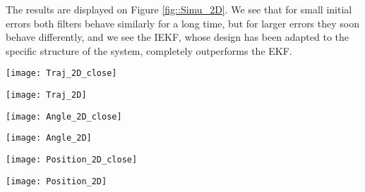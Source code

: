 \documentclass[a4paper,12pt,onecolumn]{article}
\begin{document}
The results are displayed on Figure \ref{fig::Simu_2D}. We see that for small initial errors both filters behave similarly for a long time, but for larger errors they soon behave differently, and we see  the IEKF, whose design has been adapted to the specific structure of the system, completely outperforms the EKF.



\begin{figure*}[!h]
  \centering
\begin{minipage}[b][]{0.49\linewidth}\noindent
\texttt{[image: Traj\_2D\_close]}
\end{minipage}
\begin{minipage}[b][]{0.49\linewidth}\noindent
\texttt{[image: Traj\_2D]}
\end{minipage}
\begin{minipage}[b][]{0.49\linewidth}
\texttt{[image: Angle\_2D\_close]}
\end{minipage}
\begin{minipage}[b][]{0.49\linewidth}
\texttt{[image: Angle\_2D]}
\end{minipage}
\begin{minipage}[b][]{0.49\linewidth}\noindent
\texttt{[image: Position\_2D\_close]}
\end{minipage}
\begin{minipage}[b][]{0.49\linewidth}\noindent
\texttt{[image: Position\_2D]}
\end{minipage}
  \caption{The heading and position of the car are estimated through EKF and IEKF with high rate odometry and low rate GPS measurements. Top plots illustrate the experimental setting and display the estimated trajectories, middle plots display the heading errors and bottom plots the position errors. As the starting point is assumed known in this simulation, the initial values of the latter are zero. But it increases afterwards due to initial heading error.
\textbf{Left column:} small initial angle error (1$^{\circ}$). We see EKF and IEKF behave similarly (at least for a long time) as propagation steps are identical. \textbf{Right column:} large initial angle error (45$^{\circ}$). The behaviors rapidly become different, and the EKF is  outperformed. Due to its righteous use of the system's non-linearities, the IEKF keeps ensuring rapid estimation error decrease.
}
\label{fig::Simu_2D}
\end{figure*}
\end{document}
